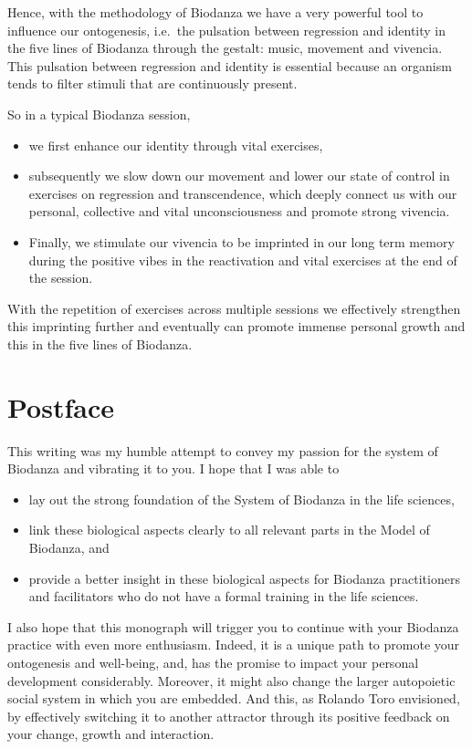 \documentclass[
  11pt,
]{book}
\providecommand{\tightlist}{%
  \setlength{\itemsep}{0pt}\setlength{\parskip}{0pt}}
\begin{document}
Hence, with the methodology of Biodanza we have a very powerful tool to influence our ontogenesis, i.e.~the pulsation between regression and identity in the five lines of Biodanza through the gestalt: music, movement and vivencia.
This pulsation between regression and identity is essential because an organism tends to filter stimuli that are continuously present.

So in a typical Biodanza session,

\begin{itemize}
\tightlist
\item
  we first enhance our identity through vital exercises,
\item
  subsequently we slow down our movement and lower our state of control in exercises on regression and transcendence, which deeply connect us with our personal, collective and vital unconsciousness and promote strong vivencia.
\item
  Finally, we stimulate our vivencia to be imprinted in our long term memory during the positive vibes in the reactivation and vital exercises at the end of the session.
\end{itemize}

With the repetition of exercises across multiple sessions we effectively strengthen this imprinting further and eventually can promote immense personal growth and this in the five lines of Biodanza.

\newpage

\hypertarget{postface}{%
\chapter*{Postface}\label{postface}}

This writing was my humble attempt to convey my passion for the system of Biodanza and vibrating it to you. I hope that I was able to

\begin{itemize}
\tightlist
\item
  lay out the strong foundation of the System of Biodanza in the life sciences,
\item
  link these biological aspects clearly to all relevant parts in the Model of Biodanza, and
\item
  provide a better insight in these biological aspects for Biodanza practitioners and facilitators who do not have a formal training in the life sciences.
\end{itemize}

I also hope that this monograph will trigger you to continue with your Biodanza practice with even more enthusiasm. Indeed, it is a unique path to promote your ontogenesis and well-being, and, has the promise to impact your personal development considerably. Moreover, it might also change the larger autopoietic social system in which you are embedded. And this, as Rolando Toro envisioned, by effectively switching it to another attractor through its positive feedback on your change, growth and interaction.

  
\end{document}
